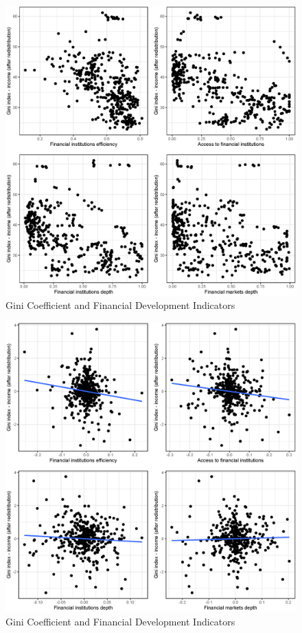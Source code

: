 \documentclass[a4paper,11pt]{article}
\begin{document}
\begin{figure}
    \caption{Gini Coefficient and Financial Development Indicators}
    \label{fig:gini_findev}
    \includegraphics[width=\textwidth, keepaspectratio]{figures/plots_findev_gini}
\end{figure}

\begin{figure}
    \caption{Gini Coefficient and Financial Development Indicators}
    \label{fig:gini_findev_dm}
    \includegraphics[width=\textwidth, keepaspectratio]{figures/plots_findev_gini_dm}
\end{figure}
\end{document}
